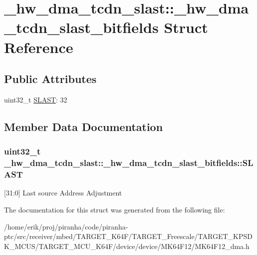 \hypertarget{struct__hw__dma__tcdn__slast_1_1__hw__dma__tcdn__slast__bitfields}{}\section{\+\_\+hw\+\_\+dma\+\_\+tcdn\+\_\+slast\+:\+:\+\_\+hw\+\_\+dma\+\_\+tcdn\+\_\+slast\+\_\+bitfields Struct Reference}
\label{struct__hw__dma__tcdn__slast_1_1__hw__dma__tcdn__slast__bitfields}
\subsection*{Public Attributes}
\begin{DoxyCompactItemize}
\item 
uint32\+\_\+t \hyperlink{struct__hw__dma__tcdn__slast_1_1__hw__dma__tcdn__slast__bitfields_a14c9ad608258f1715391d47158b6cc11}{S\+L\+A\+ST}\+: 32
\end{DoxyCompactItemize}


\subsection{Member Data Documentation}
\subsubsection[{\texorpdfstring{S\+L\+A\+ST}{SLAST}}]{\setlength{\rightskip}{0pt plus 5cm}uint32\+\_\+t \+\_\+hw\+\_\+dma\+\_\+tcdn\+\_\+slast\+::\+\_\+hw\+\_\+dma\+\_\+tcdn\+\_\+slast\+\_\+bitfields\+::\+S\+L\+A\+ST}\hypertarget{struct__hw__dma__tcdn__slast_1_1__hw__dma__tcdn__slast__bitfields_a14c9ad608258f1715391d47158b6cc11}{}\label{struct__hw__dma__tcdn__slast_1_1__hw__dma__tcdn__slast__bitfields_a14c9ad608258f1715391d47158b6cc11}
\mbox{[}31\+:0\mbox{]} Last source Address Adjustment 

The documentation for this struct was generated from the following file\+:\begin{DoxyCompactItemize}
\item 
/home/erik/proj/piranha/code/piranha-\/ptc/src/receiver/mbed/\+T\+A\+R\+G\+E\+T\+\_\+\+K64\+F/\+T\+A\+R\+G\+E\+T\+\_\+\+Freescale/\+T\+A\+R\+G\+E\+T\+\_\+\+K\+P\+S\+D\+K\+\_\+\+M\+C\+U\+S/\+T\+A\+R\+G\+E\+T\+\_\+\+M\+C\+U\+\_\+\+K64\+F/device/device/\+M\+K64\+F12/M\+K64\+F12\+\_\+dma.\+h\end{DoxyCompactItemize}
